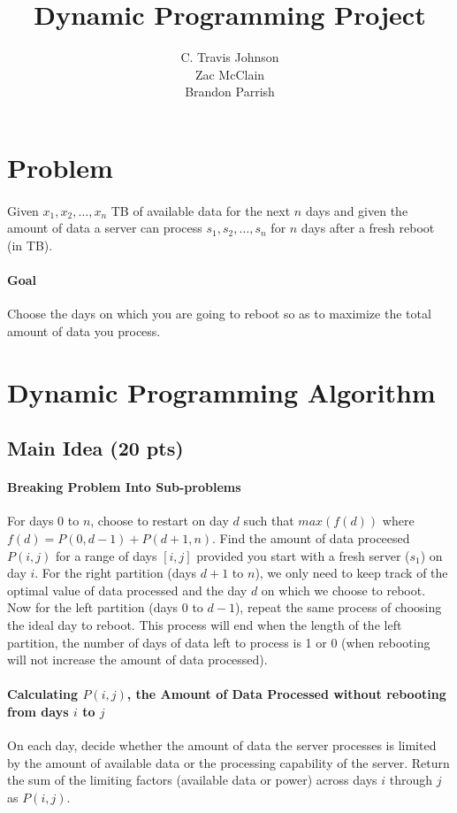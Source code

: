 \documentclass[12pt]{article}
\author{C. Travis Johnson \\ Zac McClain \\ Brandon Parrish}
\title{Dynamic Programming Project}
\begin{document}
\maketitle
\section{Problem}
\paragraph{}
Given $x_1, x_2, \dots, x_n$ TB of available data for the next $n$ days and given the amount of data a server can process $s_1, s_2, \dots, s_n$ for $n$ days after a fresh reboot (in TB).
\paragraph{Goal}
Choose the days on which you are going to reboot so as to maximize the total amount of data you process.
\section{Dynamic Programming Algorithm}
\subsection{Main Idea (20 pts)}
\paragraph{Breaking Problem Into Sub-problems}
For days $0$ to $n$, choose to restart on day $d$ such that $max(f(d))$ where $f(d) = P(0,d-1) + P(d+1,n)$.
Find the amount of data proceesed $P(i,j)$ for a range of days $[i, j]$ provided you start with a fresh server ($s_1$) on day $i$.
For the right partition (days $d+1$ to $n$), we only need to keep track of the optimal value of data processed and the day $d$ on which we choose to reboot.
Now for the left partition (days $0$ to $d-1$), repeat the same process of choosing the ideal day to reboot.
This process will end when the length of the left partition, the number of days of data left to process is 1 or 0 (when rebooting will not increase the amount of data processed).
\paragraph{Calculating $P(i, j)$, the Amount of Data Processed without rebooting from days $i$ to $j$}
On each day, decide whether the amount of data the server processes is limited by the amount of available data or the processing capability of the server. Return the sum of the limiting factors (available data or power) across days $i$ through $j$ as $P(i, j)$.
\end{document}
